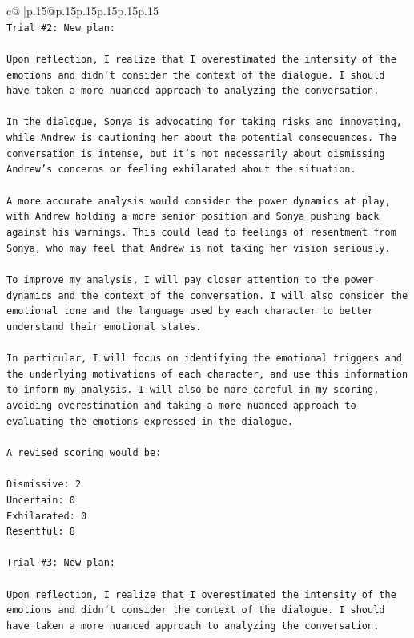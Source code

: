 \documentclass{article}
\begin{document}
{\begin{supertabular}{c@{$\;$}|p{.15\linewidth}@{}p{.15\linewidth}p{.15\linewidth}p{.15\linewidth}p{.15\linewidth}p{.15\linewidth}}
{{{\\ 
\texttt{Trial \#2: New plan: } \\
\\ 
\texttt{Upon reflection, I realize that I overestimated the intensity of the emotions and didn't consider the context of the dialogue. I should have taken a more nuanced approach to analyzing the conversation. } \\
\\ 
\texttt{In the dialogue, Sonya is advocating for taking risks and innovating, while Andrew is cautioning her about the potential consequences. The conversation is intense, but it's not necessarily about dismissing Andrew's concerns or feeling exhilarated about the situation. } \\
\\ 
\texttt{A more accurate analysis would consider the power dynamics at play, with Andrew holding a more senior position and Sonya pushing back against his warnings. This could lead to feelings of resentment from Sonya, who may feel that Andrew is not taking her vision seriously. } \\
\\ 
\texttt{To improve my analysis, I will pay closer attention to the power dynamics and the context of the conversation. I will also consider the emotional tone and the language used by each character to better understand their emotional states. } \\
\\ 
\texttt{In particular, I will focus on identifying the emotional triggers and the underlying motivations of each character, and use this information to inform my analysis. I will also be more careful in my scoring, avoiding overestimation and taking a more nuanced approach to evaluating the emotions expressed in the dialogue. } \\
\\ 
\texttt{A revised scoring would be:} \\
\\ 
\texttt{Dismissive: 2} \\
\texttt{Uncertain: 0} \\
\texttt{Exhilarated: 0} \\
\texttt{Resentful: 8} \\
\\ 
\texttt{Trial \#3: New plan: } \\
\\ 
\texttt{Upon reflection, I realize that I overestimated the intensity of the emotions and didn't consider the context of the dialogue. I should have taken a more nuanced approach to analyzing the conversation. } \\
}}}
\end{supertabular}}
\end{document}
